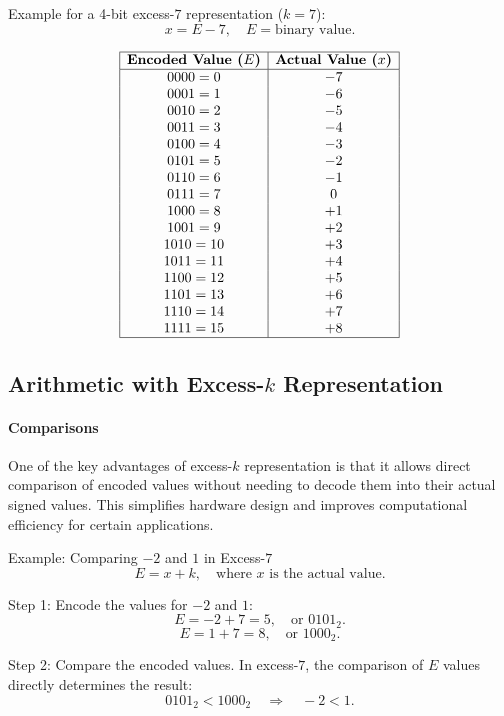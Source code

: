 Example for a 4-bit excess-\( 7 \) representation (\( k = 7 \)):
\[
x = E - 7, \quad E = \text{binary value}.
\]

\[
\begin{array}{|c|c|}
\hline
\textbf{Encoded Value (\( E \))} & \textbf{Actual Value (\( x \))} \\
\hline
0000 = 0 & -7 \\
0001 = 1 & -6 \\
0010 = 2 & -5 \\
0011 = 3 & -4 \\
0100 = 4 & -3 \\
0101 = 5 & -2 \\
0110 = 6 & -1 \\
0111 = 7 & 0 \\
1000 = 8 & +1 \\
1001 = 9 & +2 \\
1010 = 10 & +3 \\
1011 = 11 & +4 \\
1100 = 12 & +5 \\
1101 = 13 & +6 \\
1110 = 14 & +7 \\
1111 = 15 & +8 \\
\hline
\end{array}
\]


\subsection{Arithmetic with Excess-\( k \) Representation}
\paragraph{Comparisons}
One of the key advantages of excess-\( k \) representation is that it allows direct comparison of encoded values without needing to decode them into their actual signed values. This simplifies hardware design and improves computational efficiency for certain applications.

Example: Comparing \( -2 \) and \( 1 \) in Excess-\( 7 \)
\[
E = x + k, \quad \text{where } x \text{ is the actual value}.
\]

Step 1: Encode the values for \( -2 \) and \( 1 \):
\[
E = -2 + 7 = 5, \quad \text{or } 0101_2.
\]
\[
E = 1 + 7 = 8, \quad \text{or } 1000_2.
\]

Step 2: Compare the encoded values.
In excess-\( 7 \), the comparison of \( E \) values directly determines the result:
\[
0101_2 < 1000_2 \quad \Rightarrow \quad -2 < 1.
\]


